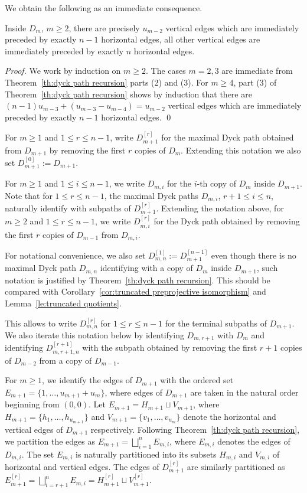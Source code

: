 \documentclass[smallextended,envcountsect,envcountsame]{svjour3}
\numberwithin{equation}{section}
\begin{document}
We obtain the following as an immediate consequence.
\begin{corollary}
  \label{cor:short hooks}
  Inside $D_m$, $m\ge2$, there are precisely $u_{m-2}$ vertical edges which are immediately preceded by exactly $n-1$ horizontal edges, all other vertical edges are immediately preceded by exactly $n$ horizontal edges.
\end{corollary}
\begin{proof}
  We work by induction on $m\ge2$.
  The cases $m=2,3$ are immediate from Theorem~\ref{th:dyck path recursion} parts (2) and (3).
  For $m\ge4$, part (3) of Theorem~\ref{th:dyck path recursion} shows by induction that there are $(n-1)u_{m-3}+(u_{m-3}-u_{m-4})=u_{m-2}$ vertical edges which are immediately preceded by exactly $n-1$ horizontal edges.
\qed\end{proof}

For $m\ge1$ and $1\le r\le n-1$, write $D_{m+1}^{[r]}$ for the maximal Dyck path obtained from $D_{m+1}$ by removing the first $r$ copies of $D_m$.
Extending this notation we also set $D_{m+1}^{[0]}:=D_{m+1}$.

For $m\ge1$ and $1\le i\le n-1$, we write $D_{m,i}$ for the $i$-th copy of $D_m$ inside $D_{m+1}$.
Note that for $1\le r\le n-1$, the maximal Dyck paths $D_{m,i}$, $r+1\le i\le n$, naturally identify with subpaths of $D_{m+1}^{[r]}$.
Extending the notation above, for $m\ge2$ and $1\le r\le n-1$, we write $D_{m,i}^{[r]}$ for the Dyck path obtained by removing the first $r$ copies of $D_{m-1}$ from $D_{m,i}$.
\begin{remark}
  For notational convenience, we also set $D_{m,n}^{[1]}:=D_{m+1}^{[n-1]}$ even though there is no maximal Dyck path $D_{m,n}$ identifying with a copy of $D_m$ inside $D_{m+1}$, such notation is justified by Theorem~\ref{th:dyck path recursion}.
  This should be compared with Corollary~\ref{cor:truncated preprojective isomorphism} and Lemma~\ref{le:truncated quotients}.

  This allows to write $D_{m,n}^{[r]}$ for $1\le r\le n-1$ for the terminal subpaths of $D_{m+1}$.
  We also iterate this notation below by identifying $D_{m,r+1}$ with $D_m$ and identifying $D_{m,r+1,n}^{[r+1]}$ with the subpath obtained by removing the first $r+1$ copies of $D_{m-2}$ from a copy of $D_{m-1}$.
\end{remark}

For $m\ge1$, we identify the edges of $D_{m+1}$ with the ordered set $E_{m+1}=\{1,\ldots,u_{m+1}+u_m\}$, where edges of $D_{m+1}$ are taken in the natural order beginning from $(0,0)$.
Let $E_{m+1}=H_{m+1}\sqcup V_{m+1}$, where $H_{m+1}=\{h_1,\ldots,h_{u_{m+1}}\}$ and $V_{m+1}=\{v_1,\ldots,v_{u_m}\}$ denote the horizontal and vertical edges of $D_{m+1}$ respectively.
Following Theorem~\ref{th:dyck path recursion}, we partition the edges as $E_{m+1}=\bigsqcup_{i=1}^n E_{m,i}$, where $E_{m,i}$ denotes the edges of $D_{m,i}$.
The set $E_{m,i}$ is naturally partitioned into its subsets $H_{m,i}$ and $V_{m,i}$ of horizontal and vertical edges.
The edges of $D_{m+1}^{[r]}$ are similarly partitioned as $E_{m+1}^{[r]}=\bigsqcup_{i=r+1}^n E_{m,i}=H_{m+1}^{[r]}\sqcup V_{m+1}^{[r]}$.
\end{document}
